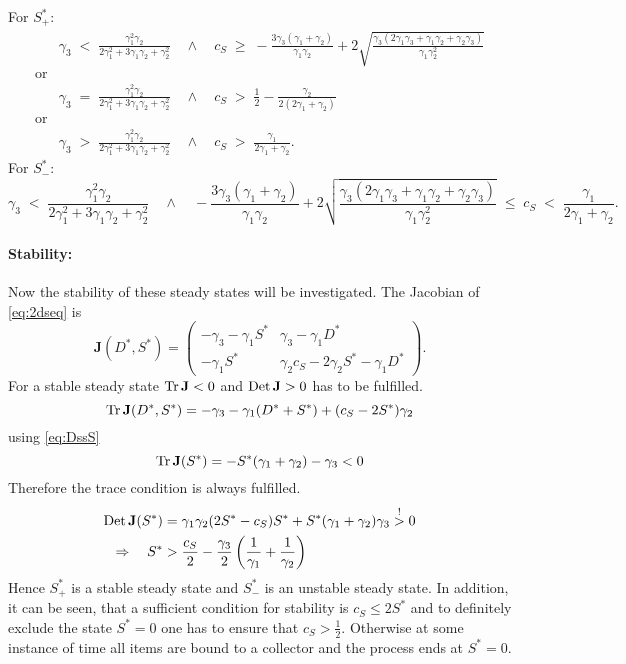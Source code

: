 For $S^*_+$:
%
\begin{align*}
 &\gamma_3 \;<\; \frac{\gamma_1^2\gamma_2}{2\gamma_1^2+3\gamma_1\gamma_2+\gamma_2^2} \quad\wedge\quad c_S\;\geq\;-\frac{3\gamma_3(\gamma_1+\gamma_2)}{\gamma_1\gamma_2}+2\sqrt{\frac{\gamma_3(2\gamma_1\gamma_3+\gamma_1\gamma_2+\gamma_2\gamma_3)}{\gamma_1\gamma_2^2}}\\
 \mbox{or} & \\
&\gamma_3\;=\;\frac{\gamma_1^2\gamma_2}{2\gamma_1^2+3\gamma_1\gamma_2+\gamma_2^2} \quad\wedge\quad c_S \;>\; \frac{1}{2}-\frac{\gamma_2}{2(2\gamma_1+\gamma_2)}\\
 \mbox{or} & \\
&\gamma_3 \;>\;\frac{\gamma_1^2\gamma_2}{2\gamma_1^2+3\gamma_1\gamma_2+\gamma_2^2} \quad\wedge\quad c_S \;>\; \frac{\gamma_1}{2\gamma_1+\gamma_2}. 
\end{align*}
%
For $S^*_-$:
%
\begin{equation*}
 \gamma_3 \;<\; \frac{\gamma_1^2\gamma_2}{2\gamma_1^2+3\gamma_1\gamma_2+\gamma_2^2}\quad \wedge \quad -\frac{3\gamma_3(\gamma_1+\gamma_2)}{\gamma_1\gamma_2}+2\sqrt{\frac{\gamma_3(2\gamma_1\gamma_3+\gamma_1\gamma_2+\gamma_2\gamma_3)}{\gamma_1\gamma_2^2}}\;\leq\;c_S\;<\;\frac{\gamma_1}{2\gamma_1+\gamma_2}.
\end{equation*}
%
\paragraph{Stability:}

Now the stability of these steady states will be investigated. The Jacobian of \eqref{eq:2dseq} is
%
\begin{equation*}
 \mathbf{J}(D^*,S^*) = 
 \begin{pmatrix}
  -\gamma_3-\gamma_1 S^* & \gamma_3-\gamma_1 D^*\\ 
  -\gamma_1 S^* &  \gamma_2 c_S -2\gamma_2 S^*-\gamma_1 D^*
 \end{pmatrix}.
\end{equation*}
%
For a stable steady state $\operatorname{Tr} \mathbf{J} < 0$ and $\operatorname{Det} \mathbf{J} > 0$ has to be fulfilled.
%
\begin{equation*}
	\operatorname{Tr} \mathbf{J}(D^*,S^*) = -\gamma_3-\gamma_1(D^*+S^*)+(c_S-2S^*)\gamma_2
\end{equation*}
%
using \eqref{eq:DssS}
%
\begin{equation*}
\operatorname{Tr} \mathbf{J}(S^*) = -S^*(\gamma_1+\gamma_2)-\gamma_3 < 0
\end{equation*}
%
Therefore the trace condition is always fulfilled. 
%
\begin{align}
\nonumber \operatorname{Det} \mathbf{J}(S^*) &= \gamma_1\gamma_2(2 S^*-c_S)S^*+S^*(\gamma_1+\gamma_2)\gamma_3 \overset{!}{>} 0\\
\Rightarrow \quad S^* &> \frac{c_S}{2}-\frac{\gamma_3}{2}\left(\frac{1}{\gamma_1}+\frac{1}{\gamma_2}\right)
\end{align}
%
Hence $S^*_+$ is a stable steady state and $S^*_-$ is an unstable steady state.
In addition, it can be seen, that a sufficient condition for stability is $c_S\leq 2 S^*$ and to definitely exclude the state $S^*=0$ one has to ensure that $c_S > \frac{1}{2}$.
Otherwise at some instance of time all items are bound to a collector and the process ends at $S^*=0$.

